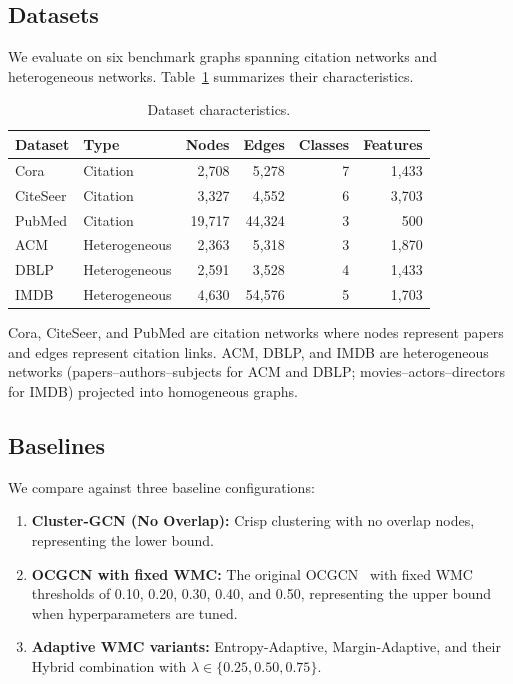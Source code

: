 \documentclass[a4paper,11pt,oneside,onecolumn,preprint]{elsarticle}
\numberwithin{equation}{section}
\begin{document}
\subsection{Datasets}
\label{subsec:datasets}

We evaluate on six benchmark graphs spanning citation networks and heterogeneous networks.
Table~\ref{tab:datasets} summarizes their characteristics.

\begin{table}[ht]
\centering
\caption{Dataset characteristics.}
\label{tab:datasets}
\begin{tabular}{llrrrr}
\toprule
\textbf{Dataset} & \textbf{Type} & \textbf{Nodes} & \textbf{Edges} & \textbf{Classes} & \textbf{Features} \\
\midrule
Cora & Citation & 2,708 & 5,278 & 7 & 1,433 \\
CiteSeer & Citation & 3,327 & 4,552 & 6 & 3,703 \\
PubMed & Citation & 19,717 & 44,324 & 3 & 500 \\
ACM & Heterogeneous & 2,363 & 5,318 & 3 & 1,870 \\
DBLP & Heterogeneous & 2,591 & 3,528 & 4 & 1,433 \\
IMDB & Heterogeneous & 4,630 & 54,576 & 5 & 1,703 \\
\bottomrule
\end{tabular}
\end{table}

Cora, CiteSeer, and PubMed are citation networks where nodes represent papers and edges represent citation links.
ACM, DBLP, and IMDB are heterogeneous networks (papers--authors--subjects for ACM and DBLP; movies--actors--directors for IMDB) projected into homogeneous graphs.

\subsection{Baselines}
\label{subsec:baselines}

We compare against three baseline configurations:

\begin{enumerate}
  \item \textbf{Cluster-GCN (No Overlap):} Crisp clustering with no overlap nodes, representing the lower bound.
  \item \textbf{OCGCN with fixed WMC:} The original OCGCN~\cite{Amintoosi2021} with fixed WMC thresholds of 0.10, 0.20, 0.30, 0.40, and 0.50, representing the upper bound when hyperparameters are tuned.
  \item \textbf{Adaptive WMC variants:} Entropy-Adaptive, Margin-Adaptive, and their Hybrid combination with $\lambda \in \{0.25, 0.50, 0.75\}$.
\end{enumerate}
\end{document}
